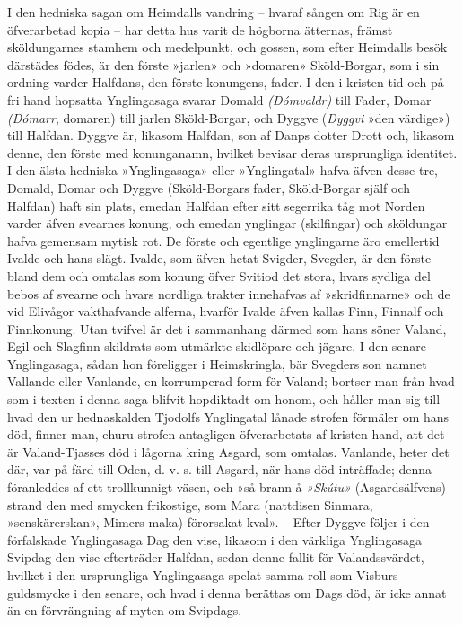 I den hedniska sagan om Heimdalls vandring -- hvaraf sången om Rig är en
öfverarbetad kopia -- har detta hus varit de högborna ätternas, främst
sköldungarnes stamhem och medelpunkt, och gossen, som efter Heimdalls
besök därstädes födes, är den förste »jarlen» och »domaren»
Sköld-Borgar, som i sin ordning varder Halfdans, den förste konungens,
fader. I den i kristen tid och på fri hand hopsatta Ynglingasaga svarar
Domald \emph{(Dómvaldr)} till Fader, Domar \emph{(Dómarr}, domaren) till
jarlen Sköld-Borgar, och Dyggve (\emph{Dyggvi} »den värdige») till
Halfdan. Dyggve är, likasom Halfdan, son af Danps dotter Drott och,
likasom denne, den förste med konunganamn, hvilket bevisar deras
ursprungliga identitet. I den älsta hedniska »Ynglingasaga» eller
»Ynglingatal» hafva äfven desse tre, Domald, Domar och Dyggve
(Sköld-Borgars fader, Sköld-Borgar själf och Halfdan) haft sin plats,
emedan Halfdan efter sitt segerrika tåg mot Norden varder äfven svearnes
konung, och emedan ynglingar (skilfingar) och sköldungar hafva gemensam
mytisk rot. De förste och egentlige ynglingarne äro emellertid Ivalde
och hans slägt. Ivalde, som äfven hetat Svigder, Svegder, är den förste
bland dem och omtalas som konung öfver Svitiod det stora, hvars sydliga
del bebos af svearne och hvars nordliga trakter innehafvas af
»skridfinnarne» och de vid Elivågor vakthafvande alferna, hvarför Ivalde
äfven kallas Finn, Finnalf och Finnkonung. Utan tvifvel är det i
sammanhang därmed som hans söner Valand, Egil och Slagfinn skildrats som
utmärkte skidlöpare och jägare. I den senare Ynglingasaga, sådan hon
föreligger i Heimskringla, bär Svegders son namnet Vallande eller
Vanlande, en korrumperad form för Valand; bortser man från hvad som i
texten i denna saga blifvit hopdiktadt om honom, och håller man sig till
hvad den ur hednaskalden Tjodolfs Ynglingatal lånade strofen
förmäler\protect\hypertarget{lb1625905.xhtmlux5cux23start214}{}{}\protect\hypertarget{lb1625905.xhtmlux5cux23start214-a}{}{}\protect\hypertarget{lb1625905.xhtmlux5cux23start214-b}{}{}\protect\hypertarget{lb1625905.xhtmlux5cux23start214-c}{}{}\protect\hypertarget{lb1625905.xhtmlux5cux23start214-d}{}{}
om hans död, finner man, ehuru strofen antagligen öfverarbetats af
kristen hand, att det är Valand-Tjasses död i lågorna kring Asgard, som
omtalas. Vanlande, heter det där, var på färd till Oden, d. v. s. till
Asgard, när hans död inträffade; denna föranleddes af ett trollkunnigt
väsen, och »så brann å \emph{»Skútu»} (Asgardsälfvens) strand den med
smycken frikostige, som Mara (nattdisen Sinmara, »senskärerskan», Mimers
maka) förorsakat kval». -- Efter Dyggve följer i den förfalskade
Ynglingasaga Dag den vise, likasom i den värkliga Ynglingasaga Svipdag
den vise efterträder Halfdan, sedan denne fallit för Valandssvärdet,
hvilket i den ursprungliga Ynglingasaga spelat samma roll som Visburs
guldsmycke i den senare, och hvad i denna berättas om Dags död, är icke
annat än en förvrängning af myten om Svipdags.

